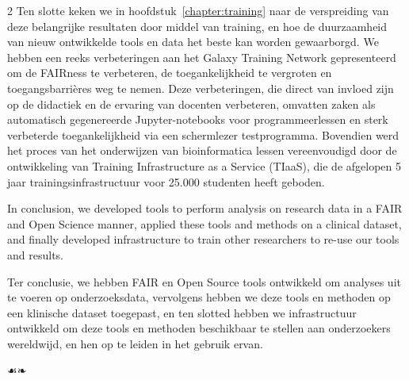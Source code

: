 \begin{paracol}{2}
Ten slotte keken we in hoofdstuk~\ref{chapter:training} naar de verspreiding van deze belangrijke resultaten door middel van training, en hoe de duurzaamheid van nieuw ontwikkelde tools en data het beste kan worden gewaarborgd.
We hebben een reeks verbeteringen aan het Galaxy Training Network gepresenteerd om de FAIRness te verbeteren, de toegankelijkheid te vergroten en toegangsbarrières weg te nemen.
Deze verbeteringen, die direct van invloed zijn op de didactiek en de ervaring van docenten verbeteren, omvatten zaken als automatisch gegenereerde Jupyter-notebooks voor programmeerlessen en sterk verbeterde toegankelijkheid via een schermlezer testprogramma.
Bovendien werd het proces van het onderwijzen van bioinformatica lessen vereenvoudigd door de ontwikkeling van Training Infrastructure as a Service (TIaaS), die de afgelopen 5 jaar trainingsinfrastructuur voor 25.000 studenten heeft geboden.

\switchcolumn*

In conclusion, we developed tools to perform analysis on research data in a FAIR and Open Science manner, applied these tools and methods on a clinical dataset, and finally developed infrastructure to train other researchers to re-use our tools and results.

\switchcolumn

Ter conclusie, we hebben FAIR en Open Source tools ontwikkeld om analyses uit te voeren op onderzoeksdata, vervolgens hebben we deze tools en methoden op een klinische dataset toegepast, en ten slotted hebben we infrastructuur ontwikkeld om deze tools en methoden beschikbaar te stellen aan onderzoekers wereldwijd, en hen op te leiden in het gebruik ervan.

\switchcolumn*

\end{paracol}

\vfill
\begin{center}
☙\quad ❧
\end{center}
\vfill

